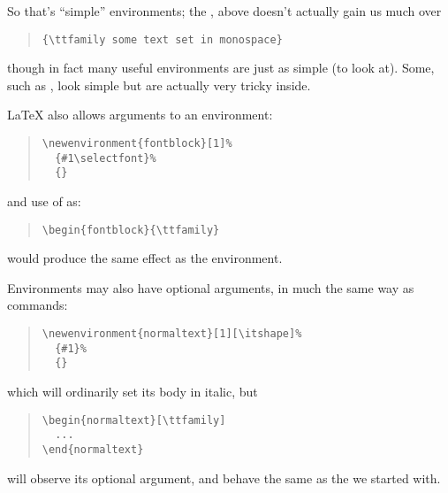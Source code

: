So that's ``simple'' environments; the , above
doesn't actually gain us much over
\begin{quote}
\begin{verbatim}
{\ttfamily some text set in monospace}
\end{verbatim}
\end{quote}
though in fact many useful environments are just as simple (to look
at).  Some, such as , look simple but are
actually very tricky inside.

\LaTeX{} also allows arguments to an environment:
\begin{quote}
\begin{verbatim}
\newenvironment{fontblock}[1]%
  {#1\selectfont}%
  {}
\end{verbatim}
\end{quote}
and use of  as:
\begin{quote}
\begin{verbatim}
\begin{fontblock}{\ttfamily}
\end{verbatim}
\end{quote}
would produce the same effect as the 
environment.

Environments may also have optional arguments, in much the same way as
commands:
\begin{quote}
\begin{verbatim}
\newenvironment{normaltext}[1][\itshape]%
  {#1}%
  {}
\end{verbatim}
\end{quote}
which will ordinarily set its body in italic, but
\begin{quote}
\begin{verbatim}
\begin{normaltext}[\ttfamily]
  ...
\end{normaltext}
\end{verbatim}
\end{quote}
will observe its optional argument, and behave the same as the
 we started with.

